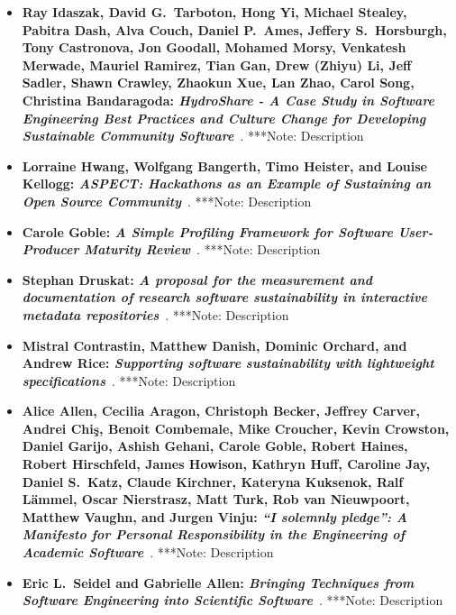 \documentclass[11pt, oneside]{amsart}
\newcommand{\note}[1]{ {\textcolor{blueish}    { ***Note:      #1 }}}
\begin{document}
\begin{itemize}
    \item \textbf{Ray Idaszak\textsuperscript{\textasteriskcentered},
    David G.~Tarboton, Hong Yi, Michael Stealey,
    Pabitra Dash, Alva Couch, Daniel P.~Ames, Jeffery S.~Horsburgh, Tony Castronova,
    Jon Goodall, Mohamed Morsy, Venkatesh Merwade, Mauriel Ramirez, Tian Gan,
    Drew (Zhiyu) Li, Jeff Sadler, Shawn Crawley, Zhaokun Xue, Lan Zhao, Carol Song,
    Christina Bandaragoda: \emph{HydroShare - A Case Study in Software Engineering
    Best Practices and Culture Change for Developing Sustainable Community
    Software}}~\cite{Idaszak:2016ws}.
    \note{Description}

    \item \textbf{Lorraine Hwang\textsuperscript{\textasteriskcentered},
    Wolfgang Bangerth, Timo Heister, and Louise Kellogg:
    \emph{ASPECT: Hackathons as an Example of Sustaining an Open Source
    Community}}~\cite{Hwang:2016ws}.
    \note{Description}

    \item \textbf{Carole Goble: \emph{A Simple Profiling Framework for Software
    User-Producer Maturity Review}}~\cite{Goble:2016ws}.
    \note{Description}

    \item \textbf{Stephan Druskat: \emph{A proposal for the measurement and
    documentation of research software sustainability in interactive metadata
    repositories}}~\cite{Druskat:2016ws}.
    \note{Description}

    \item \textbf{Mistral Contrastin, Matthew Danish,
    Dominic Orchard\textsuperscript{\textasteriskcentered}, and
    Andrew Rice: \emph{Supporting software sustainability with
    lightweight specifications}}~\cite{Contrastin:2016ws}.
    \note{Description}

    \item \textbf{Alice Allen, Cecilia Aragon, Christoph Becker, Jeffrey Carver,
    Andrei Chi\c{s}, Benoit Combemale, Mike Croucher, Kevin Crowston, Daniel Garijo,
    Ashish Gehani, Carole Goble\textsuperscript{\textasteriskcentered},
    Robert Haines, Robert Hirschfeld, James Howison,
    Kathryn Huff, Caroline Jay, Daniel S.~Katz, Claude Kirchner, Kateryna Kuksenok,
    Ralf L\"{a}mmel, Oscar Nierstrasz, Matt Turk, Rob van Nieuwpoort, Matthew Vaughn,
    and Jurgen Vinju: \emph{``I solemnly pledge'': A Manifesto for Personal
    Responsibility in the Engineering of Academic Software}}~\cite{AAllen:2016ws}.
    \note{Description}

    \item \textbf{Eric L.~Seidel\textsuperscript{\textasteriskcentered}
    and Gabrielle Allen: \emph{Bringing Techniques from Software Engineering
    into Scientific Software}}~\cite{Seidel:2016ws}.
    \note{Description}

\end{itemize}
\end{document}
